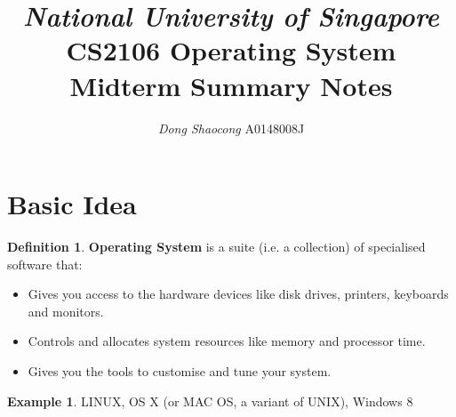 \documentclass[11pt,a4paper]{article}
\title{\textsl{National University of Singapore} \\ \textbf{CS2106 Operating System}\\ Midterm Summary Notes}
\author{\textit{Dong Shaocong} A0148008J}
\theoremstyle{definition}
\newtheorem{definition}{Definition}[section]
\newtheorem{example}{Example}[section]
\newenvironment{myitemize}
{ \begin{itemize}
    \setlength{\itemsep}{5pt}
    \setlength{\parskip}{0pt}
    \setlength{\parsep}{0pt}     }
{ \end{itemize}                  }
\begin{document}
\maketitle

\tableofcontents

\newpage
\section{Basic Idea}
\begin{definition}{\textbf{Operating System}}
	is a suite (i.e. a collection) of specialised software that:
	\begin{myitemize}
		\item Gives you access to the hardware devices like disk drives, printers, keyboards and monitors.
		\item Controls and allocates system resources like memory and processor time.
		\item Gives you the tools to customise and tune your system.
	\end{myitemize}
\end{definition}
\begin{example}
	LINUX, OS X (or MAC OS, a variant of UNIX), Windows 8
\end{example}
\end{document}
